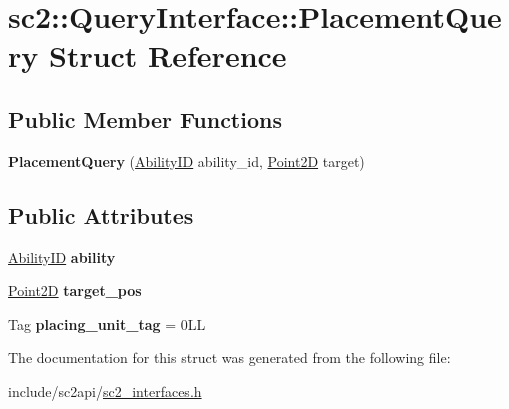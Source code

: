 \hypertarget{structsc2_1_1_query_interface_1_1_placement_query}{}\section{sc2\+:\+:Query\+Interface\+:\+:Placement\+Query Struct Reference}
\label{structsc2_1_1_query_interface_1_1_placement_query}
\subsection*{Public Member Functions}
\begin{DoxyCompactItemize}
\item 
\mbox{\label{structsc2_1_1_query_interface_1_1_placement_query_ab6ae20406ec12041f8a8c4be5dcb0d18}} 
{\bfseries Placement\+Query} (\hyperlink{classsc2_1_1_s_c2_type}{Ability\+ID} ability\+\_\+id, \hyperlink{structsc2_1_1_point2_d}{Point2D} target)
\end{DoxyCompactItemize}
\subsection*{Public Attributes}
\begin{DoxyCompactItemize}
\item 
\mbox{\label{structsc2_1_1_query_interface_1_1_placement_query_ab58999b86ff3357d57e7fa6cd75fd0ee}} 
\hyperlink{classsc2_1_1_s_c2_type}{Ability\+ID} {\bfseries ability}
\item 
\mbox{\label{structsc2_1_1_query_interface_1_1_placement_query_ad0fbd02bcc96c56ddb3d0e43f88b4c2d}} 
\hyperlink{structsc2_1_1_point2_d}{Point2D} {\bfseries target\+\_\+pos}
\item 
\mbox{\label{structsc2_1_1_query_interface_1_1_placement_query_ab3cc5038da0ebb2067070b8accfa9f0f}} 
Tag {\bfseries placing\+\_\+unit\+\_\+tag} = 0\+LL
\end{DoxyCompactItemize}


The documentation for this struct was generated from the following file\+:\begin{DoxyCompactItemize}
\item 
include/sc2api/\hyperlink{sc2__interfaces_8h}{sc2\+\_\+interfaces.\+h}\end{DoxyCompactItemize}
